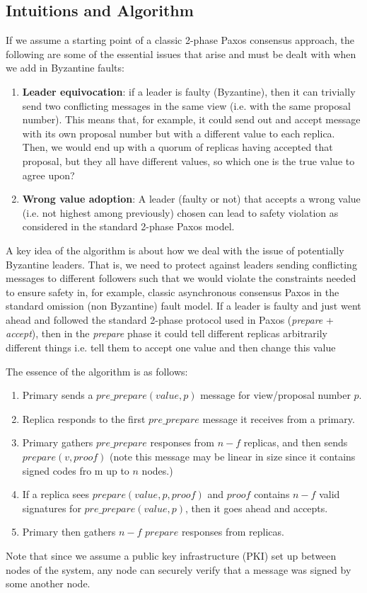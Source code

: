 \documentclass[10pt,a4paper]{article}
\begin{document}
\subsection*{Intuitions and Algorithm}

If we assume a starting point of a classic 2-phase Paxos consensus approach, the following are some of the essential issues that arise and must be dealt with when we add in Byzantine faults:
\begin{enumerate}
    \item \textbf{Leader equivocation}: if a leader is faulty (Byzantine), then it can trivially send two conflicting messages in the same view (i.e. with the same proposal number). This means that, for example, it could send out and accept message with its own proposal number but with a different value to each replica. Then, we would end up with a quorum of replicas having accepted that proposal, but they all have different values, so which one is the true value to agree upon?
    \item \textbf{Wrong value adoption}: A leader (faulty or not) that accepts a wrong value  (i.e. not highest among previously) chosen can lead to safety violation as considered in the standard 2-phase Paxos model.
\end{enumerate}
A key idea of the algorithm is about how we deal with the issue of potentially Byzantine leaders. That is, we need to protect against leaders sending conflicting messages to different followers such that we would violate the constraints needed to ensure safety in, for example, classic asynchronous consensus Paxos in the standard omission (non Byzantine) fault model. If a leader is faulty and just went ahead and followed the standard 2-phase protocol used in Paxos (\textit{prepare} + \textit{accept}), then in the \textit{prepare} phase it could tell different replicas arbitrarily different things i.e. tell them to accept one value and then change this value 


The essence of the algorithm is as follows:
\begin{enumerate}
    \item Primary sends a $pre\_prepare(value, p)$ message for view/proposal number $p$.
    \item Replica responds to the first $pre\_prepare$ message it receives from a primary.
    \item Primary gathers $pre\_prepare$ responses from $n-f$ replicas, and then sends $prepare(v, proof)$ (note this message may be linear in size since it contains signed codes fro   m up to $n$ nodes.)
    \item If a replica sees $prepare(value, p, proof)$ and $proof$ contains $n-f$ valid signatures for $pre\_prepare(value, p)$, then it goes ahead and accepts.
    \item Primary then gathers $n-f$ $prepare$ responses from replicas.
\end{enumerate}
Note that since we assume a public key infrastructure (PKI) set up between nodes of the system, any node can securely verify that a message was signed by some another node.
\end{document}
